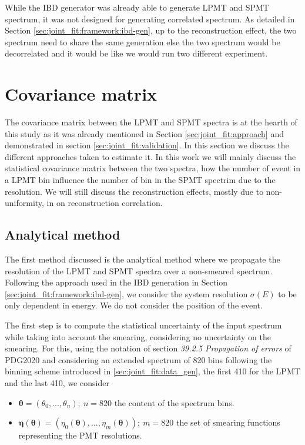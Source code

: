\documentclass[../main.tex]{subfiles}
\begin{document}
While the IBD generator was already able to generate LPMT and SPMT spectrum, it was not designed for generating correlated spectrum. As detailed in Section \ref{sec:joint_fit:framework:ibd-gen}, up to the reconstruction effect, the two spectrum need to share the same generation else the two spectrum would be decorrelated and it would be like we would run two different experiment.
%
%
%



\section{Covariance matrix}
\label{sec:joint_fit:cov_mat}

The covariance matrix between the LPMT and SPMT spectra is at the hearth of this study as it was already mentioned in Section \ref{sec:joint_fit:approach} and demonstrated in section \ref{sec:joint_fit:validation}. In this section we discuss the different approaches taken to estimate it. In this work we will mainly discuss the statistical covariance matrix between the two spectra, how the number of event in a LPMT bin influence the number of bin in the SPMT spectrim due to the resolution. We will still discuss the reconstruction effects, mostly due to non-uniformity, in on reconstruction correlation.

\subsection{Analytical method}

The first method discussed is the analytical method where we propagate the resolution of the LPMT and SPMT spectra over a non-smeared spectrum. Following the approach used in the IBD generation in Section \ref{sec:joint_fit:framework:ibd-gen}, we consider the system resolution $\sigma(E)$ to be only dependent in energy. We do not consider the position of the event.

The first step is to compute the statistical uncertainty of the input spectrum while taking into account the smearing, considering no uncertainty on the smearing. For this, using the notation of section \textit{39.2.5 Propagation of errors} of PDG2020 \cite{particle_data_group_review_2020} and considering an extended spectrum of 820 bins following the binning scheme introduced in \ref{sec:joint_fit:data_gen}, the first 410 for the LPMT and the last 410, we consider
\begin{itemize}
  \item $\bm{\theta} = (\theta_0, ..., \theta_n);~ n = 820$ the content of the spectrum bins.
  \item $\bm{\eta}(\bm{\theta}) = (\eta_0(\bm{\theta}), ..., \eta_m(\bm{\theta})); ~ m  = 820$ the set of smearing functions representing the PMT resolutions.
\end{itemize}
\end{document}
